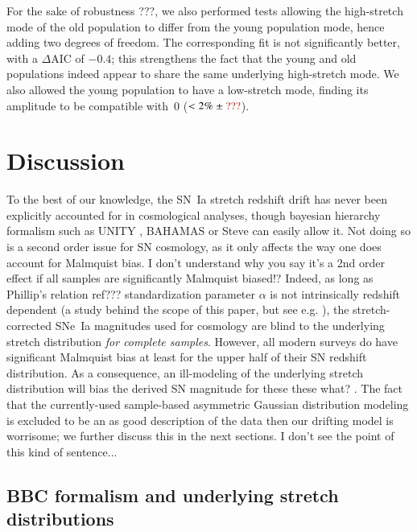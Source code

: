 \documentclass[]{aa} %
\newcommand{\mr}[1]{{\textcolor[rgb]{0.60,0.10,0.6}{#1}}}
\newcommand{\yc}[1]{{\textcolor{BrickRed}{#1}}}
\begin{document}
For the sake of robustness \yc{???}, we also \yc{performed tests} allowing the high-stretch mode of the
old population to differ from the young population mode, hence adding two
degrees of freedom. The corresponding fit is not significantly better,
with a $\Delta$AIC of $-0.4$; this strengthens the fact that the young and
old populations indeed \yc{appear to} share the same underlying high-stretch mode. We also
allowed the young population to have a low-stretch mode, finding its amplitude
to be compatible with~0 ($<2\% \pm \yc{???}$).

\section{Discussion}
\label{sec:discussion}

To the best of our knowledge, the SN~Ia stretch redshift drift has never been explicitly accounted for in cosmological analyses, \mr{though bayesian hierarchy formalism such as UNITY \citep{rubin2015}, BAHAMAS \citep{shariff2016} or Steve \citep{hinton2019} can easily allow it}. Not doing
so is a second order issue for SN cosmology, as it only affects the way one does \yc{account for}
Malmquist bias. \yc{I don't understand why you say it's a 2nd order effect if all samples are significantly Malmquist biased!?} Indeed, as long as Phillip's relation \yc{ref???}
standardization parameter $\alpha$ is not \yc{intrinsically} redshift dependent (a study behind the
scope of this paper, but see e.g. \citealt{scolnic2018a}), the stretch-corrected SNe~Ia magnitudes used for
cosmology are blind to the underlying stretch distribution \yc{\emph{for complete samples}}. \yc{However}, all modern surveys
do have significant Malmquist bias at least for the upper half of their SN
redshift distribution.  \yc{As a consequence}, an ill-modeling of the underlying stretch
distribution will bias the derived SN magnitude for these \yc{these what?} \citep[see
e.g.,][]{rubin2015,rubin2016}. 
The fact that the currently-used \mr{sample-based asymmetric Gaussian distribution modeling} is excluded to be an as good description of the data then our drifting model is worrisome;  we further discuss this in the next sections. \yc{I don't see the point of this kind of sentence...}

\subsection{BBC formalism and underlying stretch distributions}\label{sec:bbc}
\end{document}
